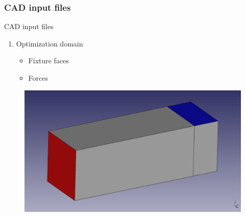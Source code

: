\subsubsection{CAD input files}
\begin{frame}{CAD input files}

\begin{enumerate}
\item Optimization domain
\begin{itemize}
\item Fixture faces 
\item Forces
\end{itemize}
\end{enumerate}

\begin{figure}
\centering
\includegraphics[width=.5\textwidth]{Pictures/CantileverColored.png}
\end{figure}
\end{frame}


